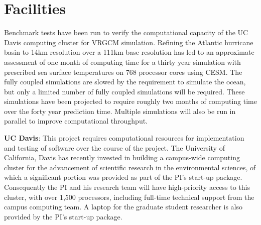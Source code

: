 \documentclass[11pt]{article}
\begin{document}
\setcounter{section}{2}

\section{Facilities}
Benchmark tests have been run to verify the computational capacity of the UC Davis computing cluster for VRGCM simulation. Refining the Atlantic hurricane basin to 14km resolution over a 111km base resolution has led to an approximate assessment of one month of computing time for a thirty year simulation with prescribed sea surface temperatures on 768 processor cores using CESM. The fully coupled simulations are slowed by the requirement to simulate the ocean, but only a limited number of fully coupled simulations will be required. These simulations have been projected to require roughly two months of computing time over the forty year prediction time. Multiple simulations will also be run in parallel to improve computational throughput.

\textbf{UC Davis}:  This project requires computational resources for implementation and testing of software over the course of the project. The University of California, Davis has recently invested in building a campus-wide computing cluster for the advancement of scientific research in the environmental sciences, of which a significant portion was provided as part of the PI’s start-up package. Consequently the PI and his research team will have high-priority access to this cluster, with over 1,500 processors, including full-time technical support from the campus computing team. A laptop for the graduate student researcher is also provided by the PI’s start-up package.
\end{document}
